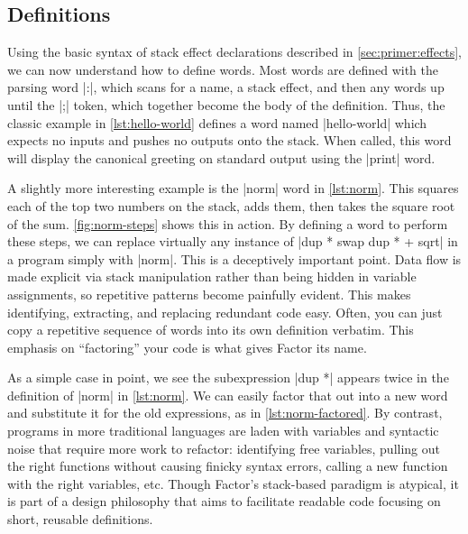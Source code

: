 \subsection{Definitions}\label{sec:primer:colon-defs}



Using the basic syntax of stack effect declarations described in
\cref{sec:primer:effects}, we can now understand how to define words.  Most
words are defined with the parsing word \factor|:|, which scans for a name, a
stack effect, and then any words up until the \factor|;| token, which together
become the body of the definition.  Thus, the classic example in
\vref{lst:hello-world} defines a word named \factor|hello-world| which expects
no inputs and pushes no outputs onto the stack.  When called, this word will
display the canonical greeting on standard output using the \factor|print|
word.


A slightly more interesting example is the \factor|norm| word in
\vref{lst:norm}.  This squares each of the top two numbers on the stack, adds
them, then takes the square root of the sum.  \vref{fig:norm-steps} shows this
in action.  By defining a word to perform these steps, we can replace virtually
any instance of
%
\factor|dup * swap dup * + sqrt|
%
in a program simply with \factor|norm|.  This is a deceptively important point.
Data flow is made explicit via stack manipulation rather than being hidden in
variable assignments, so repetitive patterns become painfully evident.  This
makes identifying, extracting, and replacing redundant code easy.  Often, you
can just copy a repetitive sequence of words into its own definition verbatim.
This emphasis on ``factoring'' your code is what gives Factor its name.


As a simple case in point, we see the subexpression \factor|dup *| appears
twice in the definition of \factor|norm| in \vref{lst:norm}.  We can easily
factor that out into a new word and substitute it for the old expressions, as
in \vref{lst:norm-factored}.  By contrast, programs in more traditional
languages are laden with variables and syntactic noise that require more work
to refactor: identifying free variables, pulling out the right functions
without causing finicky syntax errors, calling a new function with the right
variables, etc.  Though Factor's stack-based paradigm is atypical, it is part
of a design philosophy that aims to facilitate readable code focusing on short,
reusable definitions.
